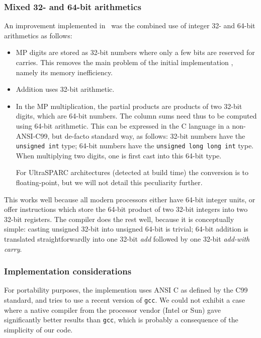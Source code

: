 \subsubsection{Mixed 32- and 64-bit arithmetics}

An improvement implemented in \scslib\ was the combined use of integer 32- and 64-bit
arithmetics as follows: 

\begin{itemize}
\item MP digits are stored as 32-bit numbers where only a few bits are
  reserved for carries. This removes the main problem of the initial
implementation \cite{Dinechin2002b}, namely its memory inefficiency.

\item Addition uses 32-bit arithmetic. 

\item In the MP multiplication, the partial products are products of
  two 32-bit digits, which are 64-bit numbers. The column sums need
  thus to be computed using 64-bit arithmetic. This can be expressed
  in the C language in a non-ANSI-C99, but de-facto standard way, as
  follows: 32-bit numbers have the \texttt{unsigned int} type; 64-bit
  numbers have the \texttt{unsigned long long int} type. When
  multiplying two digits, one is first cast into this 64-bit type.
  
  For UltraSPARC architectures (detected at build time) the
  conversion is to floating-point, but we will not detail this
  peculiarity further.
\end{itemize}


This works well because all modern processors either have 64-bit
integer units, or offer instructions which store the 64-bit product of
two 32-bit integers into two 32-bit registers. The compiler does the
rest well, because it is conceptually simple: casting unsigned 32-bit
into unsigned 64-bit is trivial; 64-bit addition is translated
straightforwardly into one 32-bit \emph{add} followed by one 32-bit
\emph{add-with carry}.




\subsubsection{Implementation considerations}

For portability purposes, the implemention uses ANSI C as defined by
the C99 standard, and tries to use a recent version of \texttt{gcc}.
We could not exhibit a case where a native compiler from the processor
vendor (Intel or Sun) gave significantly better results than
\texttt{gcc}, which is probably a consequence of the simplicity of our
code.

